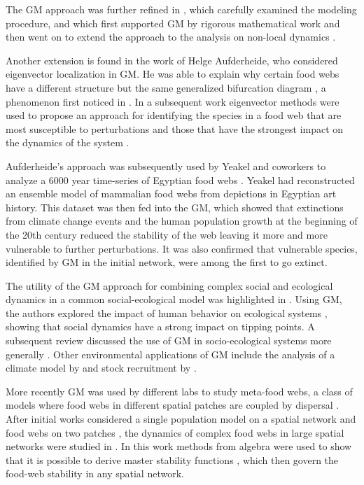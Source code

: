 \documentclass{article}
\begin{document}
The GM approach was further refined in \citet{Yeakel2011TE}, which carefully examined the modeling procedure, and 
\citet{Kuehn2013AppMath} which first supported GM by rigorous mathematical work and then went on to extend the approach to the analysis on non-local dynamics \citep{Kuehn2013DCDS}.

Another extension is found in the work of Helge Aufderheide, who considered eigenvector localization in GM. He was able to explain why certain food webs have a different structure but the same generalized bifurcation diagram \citep{Aufderheide2012NJP}, a phenomenon first noticed in \citet{GrossThesis}. In a subsequent work eigenvector methods were used to propose an approach for identifying the species in a food web that are most susceptible to perturbations and those that have the strongest impact on the dynamics of the system \citep{Aufderheide2013PNAS,doizy2018impact}. 

Aufderheide's approach was subsequently used by Yeakel and coworkers to analyze a 6000 year time-series of Egyptian food webs \citep{Yeakel2014PNAS}. Yeakel had reconstructed an ensemble model of mammalian food webs from depictions in Egyptian art history. This dataset was then fed into the GM, which showed that extinctions from climate change events and the human population growth at the beginning of the 20th century reduced the stability of the web leaving it more and more vulnerable to further perturbations. It was also confirmed that vulnerable species, identified by GM in the initial network, were among the first to go extinct. 

The utility of the GM approach for combining complex social and ecological dynamics in a common social-ecological model was highlighted in \cite{Lade2015ArXiv}. Using GM, the authors explored the impact of human behavior on ecological systems \citep{Lade2013TheorEcol}, showing that social dynamics have a strong impact on tipping points. A subsequent review discussed the use of GM in socio-ecological systems more generally \citep{lade2017generalized}. Other environmental applications of GM include the analysis of a climate model by \citet{knopf2006multiparameter} and stock recruitment by \citet{yeakel2014generalized}. 

More recently GM was used by different labs to study meta-food webs, a class of models where food webs in different spatial patches are coupled by dispersal \citep{leibold2004metacommunity}. After initial works considered a single population model on a spatial network \citep{Tromeur2016JTB} and food webs on two patches \citep{Gramlich2016JTB}, the dynamics of complex food webs in large spatial networks were studied in \citet{brechtel2018master}. In this work methods from algebra were used to show that it is possible to derive master stability functions \citep{segel1976application,pecora1998master}, which then govern the food-web stability in any spatial network. 
\end{document}
